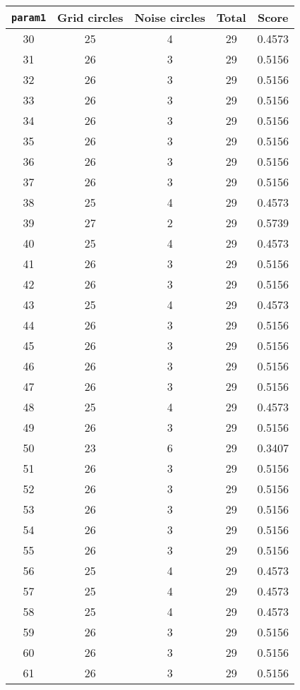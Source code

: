 \documentclass[letterpaper, 12pt]{article}
\begin{document}
\begin{longtable}{|c|c|c|c|c|}
\hline
\textbf{\texttt{param1}} & \textbf{Grid circles} & \textbf{Noise circles} & \textbf{Total} & \textbf{Score} \\
\hline
30 & 25 & 4 & 29 & 0.4573 \\
\hline
31 & 26 & 3 & 29 & 0.5156 \\
\hline
32 & 26 & 3 & 29 & 0.5156 \\
\hline
33 & 26 & 3 & 29 & 0.5156 \\
\hline
34 & 26 & 3 & 29 & 0.5156 \\
\hline
35 & 26 & 3 & 29 & 0.5156 \\
\hline
36 & 26 & 3 & 29 & 0.5156 \\
\hline
37 & 26 & 3 & 29 & 0.5156 \\
\hline
38 & 25 & 4 & 29 & 0.4573 \\
\hline
39 & 27 & 2 & 29 & 0.5739 \\
\hline
40 & 25 & 4 & 29 & 0.4573 \\
\hline
41 & 26 & 3 & 29 & 0.5156 \\
\hline
42 & 26 & 3 & 29 & 0.5156 \\
\hline
43 & 25 & 4 & 29 & 0.4573 \\
\hline
44 & 26 & 3 & 29 & 0.5156 \\
\hline
45 & 26 & 3 & 29 & 0.5156 \\
\hline
46 & 26 & 3 & 29 & 0.5156 \\
\hline
47 & 26 & 3 & 29 & 0.5156 \\
\hline
48 & 25 & 4 & 29 & 0.4573 \\
\hline
49 & 26 & 3 & 29 & 0.5156 \\
\hline
50 & 23 & 6 & 29 & 0.3407 \\
\hline
51 & 26 & 3 & 29 & 0.5156 \\
\hline
52 & 26 & 3 & 29 & 0.5156 \\
\hline
53 & 26 & 3 & 29 & 0.5156 \\
\hline
54 & 26 & 3 & 29 & 0.5156 \\
\hline
55 & 26 & 3 & 29 & 0.5156 \\
\hline
56 & 25 & 4 & 29 & 0.4573 \\
\hline
57 & 25 & 4 & 29 & 0.4573 \\
\hline
58 & 25 & 4 & 29 & 0.4573 \\
\hline
59 & 26 & 3 & 29 & 0.5156 \\
\hline
60 & 26 & 3 & 29 & 0.5156 \\
\hline
61 & 26 & 3 & 29 & 0.5156 \\

\end{longtable}
\end{document}

